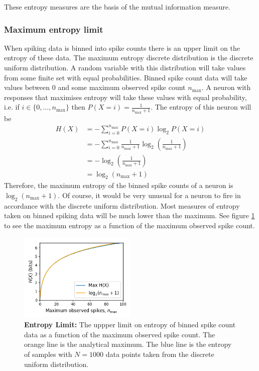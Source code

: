 \documentclass[a4paper,12pt]{article}
\theoremstyle{definition}
\begin{document}
        These entropy measures are the basis of the mutual information measure.

        \subsubsection{Maximum entropy limit}\label{sec:entropy_limit}
        When spiking data is binned into spike counts there is an upper limit on the entropy of these data. The maximum entropy discrete distribution is the discrete uniform distribution. A random variable with this distribution will take values from some finite set with equal probabilities. Binned spike count data will take values between $0$ and some maximum observed spike count $n_{\max}$. A neuron with responses that maximises entropy will take these values with equal probability, i.e. if $i \in \lbrace 0, \dots, n_{\max} \rbrace$ then $P(X = i) = \frac{1}{n_{\max} + 1}$. The entropy of this neuron will be
        \begin{align*}
          H(X)  &= - \sum_{i=0}^{n_{\max}} P(X = i) \log _2 P(X=i) \\
                &= - \sum_{i=0}^{n_{\max}} \frac{1}{n_{\max} + 1} \log_2 \left( \frac{1}{n_{\max} + 1} \right) \\
                &= - \log_2 \left( \frac{1}{n_{\max} + 1} \right) \\
                &= \log_2 \left( n_{\max} + 1 \right)
        \end{align*}
        Therefore, the maximum entropy of the binned spike counts of a neuron is $\log _2 \left( n_{\max} + 1 \right)$. Of course, it would be very unusual for a neuron to fire in accordance with the discrete uniform distribution. Most measures of entropy taken on binned spiking data will be much lower than the maximum. See figure \ref{fig:entropy_limit} to see the maximum entropy as a function of the maximum observed spike count.

        \begin{figure}[h]
          \centering
          \includegraphics[width=0.5\textwidth]{figures/entropy_limit.png}
          \caption{\textbf{Entropy Limit:} The uppper limit on entropy of binned spike count data as a function of the maximum observed spike count. The orange line is the analytical maximum. The blue line is the entropy of samples with $N=1000$ data points taken from the discrete uniform distribution.}
          \label{fig:entropy_limit}
        \end{figure}
\end{document}
